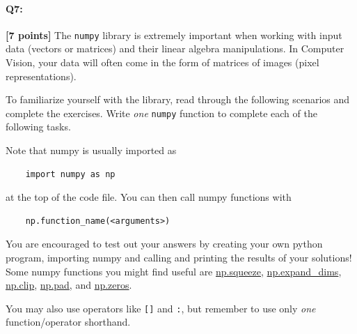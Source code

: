 \pagebreak
\paragraph{Q7:} \textbf{[7 points]} The \texttt{numpy} library is extremely important when working with input data (vectors or matrices) and their linear algebra manipulations. In Computer Vision, your data will often come in the form of matrices of images (pixel representations). 

 To familiarize yourself with the library, read through the following scenarios and complete the exercises. Write \emph{one} \texttt{numpy} function to complete each of the following tasks.

Note that numpy is usually imported as
\begin{verbatim}
    import numpy as np
\end{verbatim}
at the top of the code file. You can then call numpy functions with \begin{verbatim}
    np.function_name(<arguments>)
\end{verbatim}
You are encouraged to test out your answers by creating your own python program, importing numpy and calling and printing the results of your solutions! Some numpy functions you might find useful are \href{https://numpy.org/doc/stable/reference/generated/numpy.squeeze.html}{np.squeeze}, \href{https://numpy.org/doc/stable/reference/generated/numpy.expand_dims.html}{np.expand\_dims}, \href{https://numpy.org/doc/stable/reference/generated/numpy.clip.html}{np.clip}, \href{https://numpy.org/doc/stable/reference/generated/numpy.pad.html}{np.pad}, and \href{https://numpy.org/doc/stable/reference/generated/numpy.zeros.html}{np.zeros}.

You may also use operators like \texttt{[]} and \texttt{:}, but remember to use only \textit{one} function/operator shorthand.

